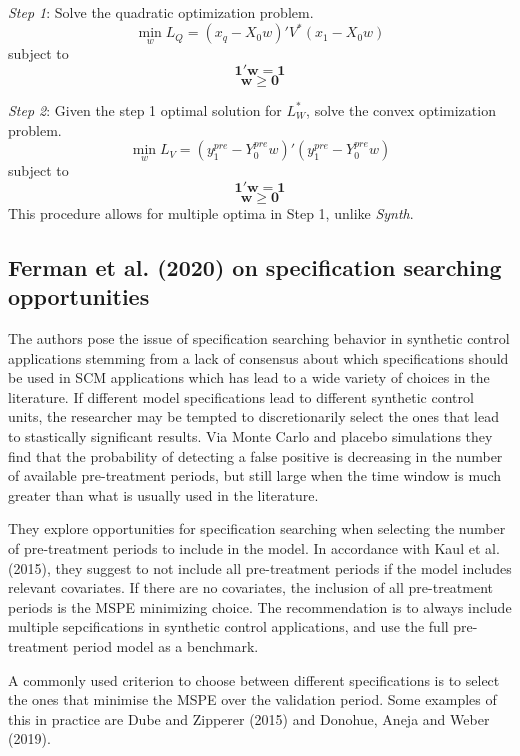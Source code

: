 \documentclass[12pt,a4paper,draft]{article}
\begin{document}
\emph{Step 1}: Solve the quadratic optimization problem.
$$
    \min_w  L_Q = (x_q-X_0 w)' V^* (x_1 - X_0 w)
$$
subject to 
$$ \mathbf{1'w=1} $$
$$ \mathbf{w \ge 0} $$

\emph{Step 2}: Given the step 1 optimal solution for $L_W^*$, solve the 
convex optimization problem.
$$ \min_w  L_V = (y_1^{pre}-Y_0^{pre}w)'(y_1^{pre}-Y_0^{pre}w)$$
subject to
$$ \mathbf{1'w=1} $$
$$ \mathbf{w \ge 0} $$
This procedure allows for multiple optima in Step 1, unlike \emph{Synth}.






\subsection{Ferman et al. (2020) on specification searching opportunities}

The authors pose the issue of specification searching behavior in synthetic 
control applications stemming from a lack of consensus about which specifications should 
be used in SCM applications which has lead to a wide variety of choices in the 
literature. If different model specifications lead to different synthetic control 
units, the researcher may be tempted to discretionarily select the ones that lead 
to stastically significant results. Via Monte Carlo and placebo simulations they 
find that the probability of detecting a false positive is decreasing in the 
number of available pre-treatment periods, but still large when the time window 
is much greater than what is usually used in the literature.

They explore opportunities for specification searching when selecting the number 
of pre-treatment periods to include in the model. In accordance with Kaul et al.
(2015), they suggest to not include all pre-treatment periods if the model 
includes relevant covariates. If there are no covariates, the inclusion of all 
pre-treatment periods is the MSPE minimizing choice. The recommendation is to 
always include multiple sepcifications in synthetic control applications, and 
use the full pre-treatment period model as a benchmark.

A commonly used criterion to choose between different specifications is to 
select the ones that minimise the MSPE over the validation period. Some examples 
of this in practice are Dube and Zipperer (2015) and Donohue, Aneja and Weber 
(2019).
\end{document}
